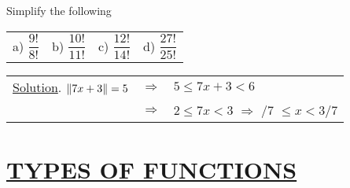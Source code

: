 \documentclass[11pt]{amsbook}
\begin{document}
\begin{exercise}
Simplify the following
\begin{table}[ht]
\begin{tabular}{l l l l}
a) $ \dfrac{9!}{8!} $  & b) $ \dfrac{10!}{11!} $ & c) $ \dfrac{12!}{14!} $ &
d) $ \dfrac{27!}{25!} $
\end{tabular}
\end{table}
\end{exercise}

\begin{tabular}{l c l}
\underline{Solution}. $ \Arrowvert {7x + 3} \Arrowvert = 5$ &  $\Rightarrow$  & $5 \leqslant 7x + 3 < 6$ \\
& $\Rightarrow$ & $2 \leqslant 7x < 3$ \; $\Rightarrow $ \; 2/7 $\leqslant x < 3/7$ 
\end{tabular} 

\setcounter{sec}{2} 




\section*{%
\underline{TYPES OF FUNCTIONS}} 

\end{document}
